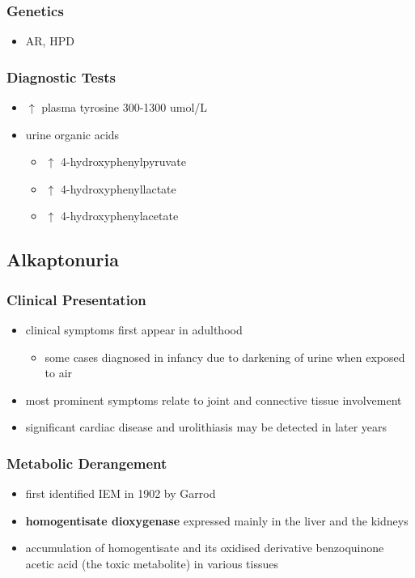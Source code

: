 \documentclass{scrartcl}
\begin{document}
\subsubsection{Genetics}
\label{sec:org2bf725a}
\begin{itemize}
\item AR, HPD
\end{itemize}
\subsubsection{Diagnostic Tests}
\label{sec:org873e654}
\begin{itemize}
\item \(\uparrow\) plasma tyrosine 300-1300 umol/L
\item urine organic acids
\begin{itemize}
\item \(\uparrow\) 4-hydroxyphenylpyruvate
\item \(\uparrow\) 4-hydroxyphenyllactate
\item \(\uparrow\) 4-hydroxyphenylacetate
\end{itemize}
\end{itemize}

\subsection{Alkaptonuria}
\label{sec:org760e6d2}
\subsubsection{Clinical Presentation}
\label{sec:org7c86e7a}
\begin{itemize}
\item clinical symptoms first appear in adulthood
\begin{itemize}
\item some cases diagnosed in infancy due to darkening of urine when
exposed to air
\end{itemize}
\item most prominent symptoms relate to joint and connective tissue involvement
\item significant cardiac disease and urolithiasis may be detected in later years
\end{itemize}
\subsubsection{Metabolic Derangement}
\label{sec:orgca6e689}
\begin{itemize}
\item first identified IEM in 1902 by Garrod
\item \textbf{homogentisate dioxygenase} expressed mainly in the liver and the
kidneys
\end{itemize}
\begin{itemize}
\item accumulation of homogentisate and its oxidised derivative
benzoquinone acetic acid (the toxic metabolite) in various tissues
\end{itemize}
\end{document}
